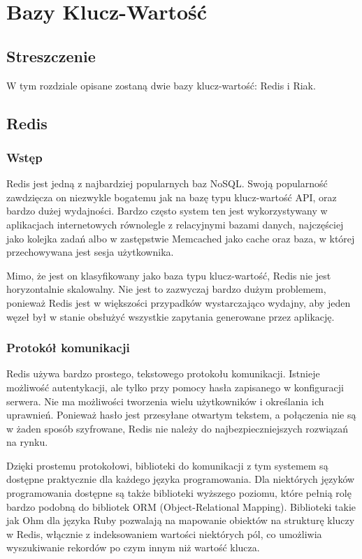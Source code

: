 \chapter{Bazy Klucz-Wartość}

\section*{Streszczenie}
W tym rozdziale opisane zostaną dwie bazy klucz-wartość: Redis i Riak.

\section{Redis}
\label{sec:redis}

\subsection*{Wstęp} 

Redis jest jedną z najbardziej popularnych baz NoSQL.
Swoją popularność zawdzięcza on niezwykle bogatemu jak na bazę typu klucz-wartość API, oraz bardzo dużej wydajności.
Bardzo często system ten jest wykorzystywany w aplikacjach internetowych równolegle z relacyjnymi bazami danych, najczęściej jako kolejka zadań albo w zastępstwie Memcached jako cache oraz baza, w której przechowywana jest sesja użytkownika.

Mimo, że jest on klasyfikowany jako baza typu klucz-wartość, Redis nie jest horyzontalnie skalowalny.
Nie jest to zazwyczaj bardzo dużym problemem, ponieważ Redis jest w większości przypadków wystarczająco wydajny, aby jeden węzeł był w stanie obsłużyć wszystkie zapytania generowane przez aplikację.

\subsection*{Protokół komunikacji}

Redis używa bardzo prostego, tekstowego protokołu komunikacji.
Istnieje możliwość autentykacji, ale tylko przy pomocy hasła zapisanego w konfiguracji serwera.
Nie ma możliwości tworzenia wielu użytkowników i określania ich uprawnień.
Ponieważ hasło jest przesyłane otwartym tekstem, a połączenia nie są w żaden sposób szyfrowane, Redis nie należy do najbezpieczniejszych rozwiązań na rynku.

Dzięki prostemu protokołowi, biblioteki do komunikacji z tym systemem są dostępne praktycznie dla każdego języka programowania.
Dla niektórych języków programowania dostępne są także biblioteki wyższego poziomu, które pełnią rolę bardzo podobną do bibliotek ORM (Object-Relational Mapping).
Biblioteki takie jak Ohm dla języka Ruby pozwalają na mapowanie obiektów na strukturę kluczy w Redis, włącznie z indeksowaniem wartości niektórych pól, co umożliwia wyszukiwanie rekordów po czym innym niż wartość klucza. 


